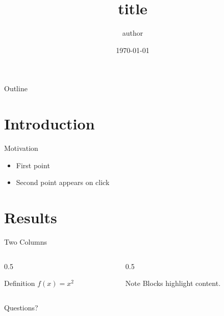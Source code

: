 \documentclass[aspectratio=169]{beamer}
\title{{{title}}}
\author{{{author}}}
\date{\today}
\begin{document}
\maketitle

\begin{frame}{Outline}
  \tableofcontents
\end{frame}

\section{Introduction}

\begin{frame}{Motivation}
  \begin{itemize}
    \item First point
    \item<2-> Second point appears on click
  \end{itemize}
\end{frame}

\section{Results}

\begin{frame}{Two Columns}
  \begin{columns}
    \begin{column}{0.5\textwidth}
      \begin{block}{Definition}
        $f(x) = x^2$
      \end{block}
    \end{column}
    \begin{column}{0.5\textwidth}
      \begin{alertblock}{Note}
        Blocks highlight content.
      \end{alertblock}
    \end{column}
  \end{columns}
\end{frame}

\begin{frame}[standout]
  Questions?
\end{frame}
\end{document}
